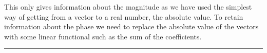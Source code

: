 \documentclass[10pt]{article}
\begin{document}
\begin{enumerate}
  This only gives information about the magnitude as we have used the
  simplest way of getting from a vector to a real number, the absolute
  value. To retain information about the phase we need to replace the
  absolute value of the vectors with some linear functional such as
  the sum of the coefficients. 
  \begin{center}
    \rule{0.9\textwidth}{.1pt}
  \end{center}
\end{enumerate}
\end{document}
